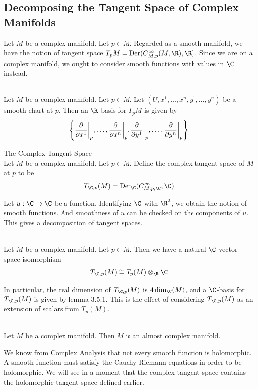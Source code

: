 \documentclass[a4paper]{article}
\begin{document}
\subsection{Decomposing the Tangent Space of Complex Manifolds}
Let $M$ be a complex manifold. Let $p\in M$. Regarded as a smooth manifold, we have the notion of tangent space $T_pM=\text{Der}(C_{M,p}^\infty(M,\R),\R)$. Since we are on a complex manifold, we ought to consider smooth functions with values in $\C$ instead. 

\begin{lmm}{}{}\\
Let $M$ be a complex manifold. Let $p\in M$. Let $(U,x^1,\dots,x^n,y^1,\dots,y^n)$ be a smooth chart at $p$. Then an $\R$-basis for $T_pM$ is given by $$\left\{\frac{\partial}{\partial x^1}\bigg{|}_p,\dots,\frac{\partial}{\partial x^n}\bigg{|}_p,\frac{\partial}{\partial y^1}\bigg{|}_p,\dots,\frac{\partial}{\partial y^n}\bigg{|}_p\right\}$$
\end{lmm}

\begin{defn}{The Complex Tangent Space}{}\\
Let $M$ be a complex manifold. Let $p\in M$. Define the complex tangent space of $M$ at $p$ to be $$T_{\C,p}(M)=\text{Der}_\C(C_{M,p,\C}^\infty,\C)$$
\end{defn}

Let $u:\C\to\C$ be a function. Identifying $\C$ with $\R^2$, we obtain the notion of smooth functions. And smoothness of $u$ can be checked on the components of $u$. This gives a decomposition of tangent spaces. 

\begin{lmm}{}{}\\
Let $M$ be a complex manifold. Let $p\in M$. Then we have a natural $\C$-vector space isomorphism $$T_{\C,p}(M)\cong T_p(M)\otimes_\R\C$$
\end{lmm}

In particular, the real dimension of $T_{\C,p}(M)$ is $4\dim_\C(M)$, and a $\C$-basis for $T_{\C,p}(M)$ is given by lemma 3.5.1. This is the effect of considering $T_{\C,p}(M)$ as an extension of scalars from $T_p(M)$. 

\begin{prp}{}{}\\
Let $M$ be a complex manifold. Then $M$ is an almost complex manifold. 
\end{prp}

We know from Complex Analysis that not every smooth function is holomorphic. A smooth function must satisfy the Cauchy-Riemann equations in order to be holomorphic. We will see in a moment that the complex tangent space contains the holomorphic tangent space defined earlier. 
\end{document}
